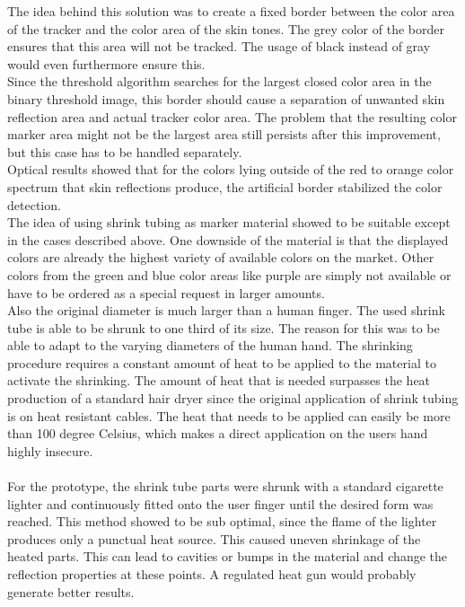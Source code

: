 The idea behind this solution was to create a fixed border between the color area of the tracker and the color area of the skin tones. The grey color of the border ensures that this area will not be tracked. The usage of black instead of gray would even furthermore ensure this. 
\\Since the threshold algorithm searches for the largest closed color area in the binary threshold image, this border should cause a separation of unwanted skin reflection area and actual tracker color area. The problem that the resulting color marker area might not be the largest area still persists after this improvement, but this case has to be handled separately.
\\Optical results showed that for the colors lying outside of the red to orange color spectrum that skin reflections produce, the artificial border stabilized the color detection.
\\The idea of using shrink tubing as marker material showed to be suitable except in the cases described above. One downside of the material is that the displayed colors are already the highest variety of available colors on the market. Other colors from the green and blue color areas like purple are simply not available or have to be ordered as a special request in larger amounts.
\\Also the original diameter is much larger than a human finger. The used shrink tube is able to be shrunk to one third of its size. The reason for this was to be able to adapt to the varying diameters of the human hand. The shrinking procedure requires a constant amount of heat to be applied to the material to activate the shrinking. The amount of heat that is needed surpasses the heat production of a standard hair dryer since the original application of shrink tubing is on heat resistant cables. The heat that needs to be applied can easily be more than 100 degree Celsius, which makes a direct application on the users hand highly insecure.
\\\\For the prototype, the shrink tube parts were shrunk with a standard cigarette lighter and continuously fitted onto the user finger until the desired form was reached. This method showed to  be sub optimal, since the flame of the lighter produces only a punctual heat source. This caused uneven shrinkage of the heated parts. This can lead to cavities or bumps in the material and change the reflection properties at these points. A regulated heat gun would probably generate better results.
